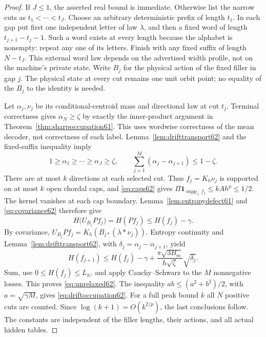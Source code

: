 \begin{proof}
If $J\le1$, the asserted real bound is immediate. Otherwise list the
narrow cuts as $t_1<\cdots<t_J$. Choose an arbitrary deterministic
prefix of length $t_1$. In each gap put first one independent letter
of law $\lambda$, and then a fixed word of length $t_{j+1}-t_j-1$.
Such a word exists at every length because the alphabet is nonempty:
repeat any one of its letters. Finish with any fixed suffix of length
$N-t_J$. This external word law depends on the advertised width profile,
not on the machine's private state. Write $B_j$ for the physical action
of the fixed filler in gap $j$. The physical state at every cut remains
one unit orbit point; no equality of the $B_j$ to the identity is needed.

Let $\alpha_j,\nu_j$ be its conditional-centroid mass and directional
law at cut $t_j$. Terminal correctness gives $\alpha_N\ge\zeta$ by
exactly the inner-product argument in Theorem~\ref{thm:sharpoccupation61}.
This uses wordwise correctness of the mean decoder, not correctness of
each label. Lemma~\ref{lem:drifttransport62} and the fixed-suffix
inequality imply
\[
 1\ge\alpha_1\ge\cdots\ge\alpha_J\ge\zeta,
 \qquad\sum_{j=1}^{M}(\alpha_j-\alpha_{j+1})\le1-\zeta.
\]
There are at most $k$ directions at each selected cut. Thus
$f_j=K_h\nu_j$ is supported on at most $k$ open chordal caps, and
\eqref{eq:caps62} gives $\Pi\boldsymbol1_{\operatorname{supp}_+f_j}
\le kAh^p\le1/2$. The kernel vanishes at each cap boundary.
Lemma~\ref{lem:entropydefect61} and \eqref{eq:covariance62} therefore give
\[
 H\bigl(U_{B_j}P f_j\bigr)=H(P f_j)\le H(f_j)-\gamma.
\]
By covariance, $U_{B_j}P f_j=K_h(B_{j*}(\lambda*\nu_j))$.
Entropy continuity and Lemma~\ref{lem:drifttransport62}, with
$\delta_j=\alpha_j-\alpha_{j+1}$, yield
\[
 H(f_{j+1})\le H(f_j)-\gamma+
           \frac{\pi\sqrt{3B_m}}{h\sqrt\zeta}\sqrt{\delta_j}.
\]
Sum, use $0\le H(f_j)\le L_h$, and apply Cauchy--Schwarz to the
$M$ nonnegative losses. This proves \eqref{eq:unrelaxed62}.
The inequality $ab\le(a^2+b^2)/2$, with
$a=\sqrt{\gamma M}$, gives \eqref{eq:driftoccupation62}.
For a full peak bound $k$ all $N$ positive cuts are counted. Since
$\log(k+1)=O(k^{2/p})$, the last conclusions follow. The constants
are independent of the filler lengths, their actions, and all actual
hidden tables.
\end{proof}


